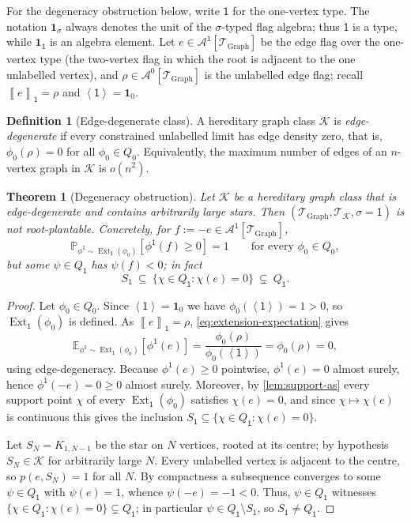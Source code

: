 \documentclass[11pt]{article}
\newtheorem{theorem}{Theorem}
\theoremstyle{definition}
\newtheorem{definition}[definition]{Definition}
\newcommand{\E}{\mathbb{E}}
\newcommand{\Prob}{\mathbb{P}}
\newcommand{\A}{\mathcal{A}}
\newcommand{\K}{\mathcal{K}}
\newcommand{\T}{\mathcal{T}}
\newcommand{\Ext}{\operatorname{Ext}}
\newcommand{\brak}[1]{\left\langle #1\right\rangle}
\newcommand{\avg}[2]{\left\llbracket #1 \right\rrbracket_{#2}}
\newcommand{\one}{\mathbf 1}
\newcommand{\vtype}{\mathsf{1}}
\begin{document}
For the degeneracy obstruction below, write \(\vtype\) for the one-vertex
type.  The notation \(\one_\sigma\) always denotes the unit of the
\(\sigma\)-typed flag algebra; thus \(\vtype\) is a type, while
\(\one_{\vtype}\) is an algebra element.  Let
$e\in\A^{\vtype}[\T_{\mathrm{Graph}}]$ be the edge flag over the one-vertex type (the
two-vertex flag in which the root is adjacent to the one unlabelled vertex), and
$\rho\in\A^0[\T_{\mathrm{Graph}}]$ is
the unlabelled edge flag; recall $\avg{e}{\vtype}=\rho$ and
$\brak{\vtype}=\one_0$.

\begin{definition}[Edge-degenerate class]\label{def:edge-degenerate}
A hereditary graph class $\K$ is \emph{edge-degenerate} if every constrained
unlabelled limit has edge density zero, that is, $\phi_0(\rho)=0$ for all
$\phi_0\in Q_0$.  Equivalently, the maximum number of edges of an $n$-vertex graph
in $\K$ is $o(n^2)$.
\end{definition}

\begin{theorem}[Degeneracy obstruction]\label{thm:degenerate-obstruction}
Let $\K$ be a hereditary graph class that is edge-degenerate and contains
arbitrarily large stars.  Then $(\T_{\mathrm{Graph}},\T_\K,\sigma{=}\vtype)$ is not
root-plantable.  Concretely, for $f:=-e\in\A^{\vtype}[\T_{\mathrm{Graph}}]$,
\[
  \Prob_{\phi^{\vtype}\sim\Ext_{\vtype}(\phi_0)}[\phi^{\vtype}(f)\ge0]=1
  \qquad\text{for every }\phi_0\in Q_0,
\]
but some $\psi\in Q_{\vtype}$ has $\psi(f)<0$; in fact
\[
  S_{\vtype}\ \subseteq\ \{\chi\in Q_{\vtype}:\chi(e)=0\}\ \subsetneq\ Q_{\vtype}.
\]
\end{theorem}

\begin{proof}
Let $\phi_0\in Q_0$.  Since $\brak{\vtype}=\one_0$ we
have $\phi_0(\brak{\vtype})=1>0$, so $\Ext_{\vtype}(\phi_0)$ is defined.  As $\avg{e}{\vtype}=\rho$,
\eqref{eq:extension-expectation} gives
\[
  \E_{\phi^{\vtype}\sim\Ext_{\vtype}(\phi_0)}[\phi^{\vtype}(e)]
  =\frac{\phi_0(\rho)}{\phi_0(\brak{\vtype})}=\phi_0(\rho)=0,
\]
using edge-degeneracy.  Because $\phi^{\vtype}(e)\ge0$ pointwise, $\phi^{\vtype}(e)=0$ almost
surely, hence $\phi^{\vtype}(-e)=0\ge0$ almost surely.  Moreover,
by \cref{lem:support-as} every support point $\chi$ of every $\Ext_{\vtype}(\phi_0)$
satisfies $\chi(e)=0$, and since $\chi\mapsto\chi(e)$ is continuous this gives the
inclusion $S_{\vtype}\subseteq\{\chi\in Q_{\vtype}:\chi(e)=0\}$.

Let $S_N=K_{1,N-1}$ be the star on $N$
vertices, rooted at its centre; by hypothesis $S_N\in\K$ for arbitrarily large $N$.
Every unlabelled vertex is adjacent to the centre, so $p(e,S_N)=1$ for all $N$.  By
compactness a subsequence converges to some $\psi\in Q_{\vtype}$ with $\psi(e)=1$, whence
$\psi(-e)=-1<0$.  Thus, $\psi\in Q_{\vtype}$ witnesses
$\{\chi\in Q_{\vtype}:\chi(e)=0\}\subsetneq Q_{\vtype}$; in particular
$\psi\in Q_{\vtype}\setminus S_{\vtype}$, so $S_{\vtype}\ne Q_{\vtype}$.
\end{proof}
\end{document}
